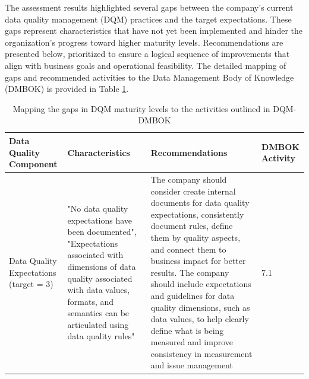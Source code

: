 \documentclass[conference]{IEEEtran}
\begin{document}
The assessment results highlighted several gaps between the company’s current data quality management (DQM) practices and the target expectations. These gaps represent characteristics that have not yet been implemented and hinder the organization’s progress toward higher maturity levels. Recommendations are presented below, prioritized to ensure a logical sequence of improvements that align with business goals and operational feasibility. The detailed mapping of gaps and recommended activities to the Data Management Body of Knowledge (DMBOK) is provided in Table \ref{tab:mapping}.

\begin{table}[hbt!]
\caption{Mapping the gaps in DQM maturity levels to the activities outlined in DQM-DMBOK}
\label{tab:mapping}
\centering
\begin{tabular}{|p{2cm}|p{5cm}|p{5cm}|p{2cm}|}
\hline
\textbf{Data Quality Component} & \textbf{Characteristics} & \textbf{Recommendations} & \textbf{DMBOK Activity} \\
\hline
Data Quality Expectations (target = 3) & "No data quality expectations have been documented", "Expectations associated with dimensions of data quality associated with data values, formats, and semantics can be articulated using data quality rules" & The company should consider create internal documents for data quality expectations, consistently document rules, define them by quality aspects, and connect them to business impact for better results. The company should include expectations and guidelines for data quality dimensions, such as data values, to help clearly define what is being measured and improve consistency in measurement and issue management & 7.1 \\


\end{tabular}
\end{table}
\end{document}
